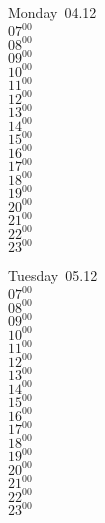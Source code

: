 \documentclass[11pt, a4paper]{book}\usepackage[]{graphicx}\usepackage[]{color}
\begin{document}
\begin{headerbox}
\end{headerbox}
\begin{weekdaybox}
  Monday~04.12\\
  { 
  \vfill
  $07^{00}$\\
$08^{00}$\\
$09^{00}$\\
$10^{00}$\\
$11^{00}$\\
$12^{00}$\\
$13^{00}$\\
$14^{00}$\\
$15^{00}$\\
$16^{00}$\\
$17^{00}$\\
$18^{00}$\\
$19^{00}$\\
$20^{00}$\\
$21^{00}$\\
$22^{00}$\\
$23^{00}$\\
  }
\end{weekdaybox}
\begin{weekdaybox}
  Tuesday~05.12\\
  { 
  \vfill
  $07^{00}$\\
$08^{00}$\\
$09^{00}$\\
$10^{00}$\\
$11^{00}$\\
$12^{00}$\\
$13^{00}$\\
$14^{00}$\\
$15^{00}$\\
$16^{00}$\\
$17^{00}$\\
$18^{00}$\\
$19^{00}$\\
$20^{00}$\\
$21^{00}$\\
$22^{00}$\\
$23^{00}$\\
  }
\end{weekdaybox}
\end{document}
